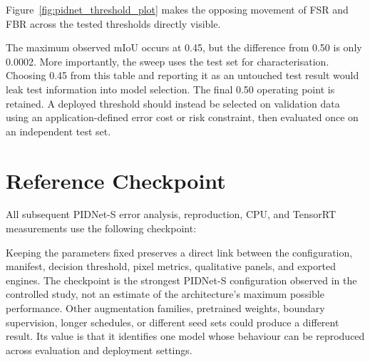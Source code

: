 Figure~\ref{fig:pidnet_threshold_plot} makes the opposing movement of FSR and
FBR across the tested thresholds directly visible.

The maximum observed mIoU occurs at 0.45, but the difference from 0.50 is only
0.0002. More importantly, the sweep uses the test set for characterisation.
Choosing 0.45 from this table and reporting it as an untouched test result
would leak test information into model selection. The final 0.50 operating
point is retained. A deployed threshold should instead be selected on
validation data using an application-defined error cost or risk constraint, then
evaluated once on an independent test set.

\section{Reference Checkpoint}

All subsequent PIDNet-S error analysis, reproduction, CPU, and TensorRT measurements
use the following checkpoint:
\begin{center}
\small{}
\end{center}
Keeping the parameters fixed preserves a direct link between the configuration,
manifest, decision threshold, pixel metrics, qualitative panels, and exported
engines. The checkpoint is the strongest PIDNet-S configuration observed in
the controlled study, not an estimate of the architecture's maximum possible
performance. Other augmentation families, pretrained weights, boundary
supervision, longer schedules, or different seed sets could produce a
different result. Its value is that it identifies one model whose behaviour
can be reproduced across evaluation and deployment settings.
